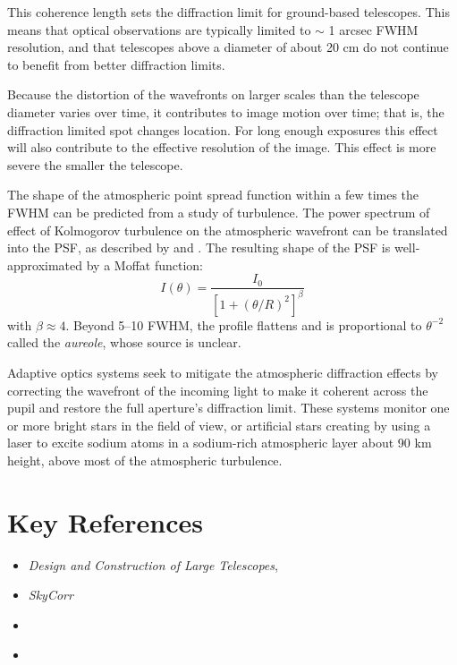 This coherence length sets the diffraction limit for ground-based
telescopes. This means that optical observations are typically limited
to $\sim$ 1 arcsec FWHM resolution, and that telescopes above a
diameter of about 20 cm do not continue to benefit from better
diffraction limits.

Because the distortion of the wavefronts on larger scales than the
telescope diameter varies over time, it contributes to image motion
over time; that is, the diffraction limited spot changes location. For
long enough exposures this effect will also contribute to the
effective resolution of the image. This effect is more severe the
smaller the telescope.

The shape of the atmospheric point spread function within a few times
the FWHM can be predicted from a study of turbulence. The power
spectrum of effect of Kolmogorov turbulence on the atmospheric
wavefront can be translated into the PSF, as described
by \citet{fried66a} and \citet{johnson73a}. The resulting shape of the
PSF is well-approximated by a Moffat function:
\begin{equation}
I(\theta) = \frac{I_0}{\left[1 + \left(\theta /
R\right)^2\right]^\beta}
\end{equation}
with $\beta \approx 4$. Beyond 5--10 FWHM, the profile flattens and is
proportional to $\theta^{-2}$ called the {\it aureole}, whose source
is unclear.

Adaptive optics systems seek to mitigate the atmospheric diffraction
effects by correcting the wavefront of the incoming light to make it
coherent across the pupil and restore the full aperture's diffraction
limit. These systems monitor one or more bright stars in the field of
view, or artificial stars creating by using a laser to excite sodium
atoms in a sodium-rich atmospheric layer about 90 km height, above
most of the atmospheric turbulence. 

\section{Key References}

\begin{itemize}
  \item
    {\it Design and Construction of Large Telescopes},
      \citet{bely}
  \item
    {\it SkyCorr}
  \item \citet{fried66a}
  \item \citet{johnson73a}
\end{itemize}

